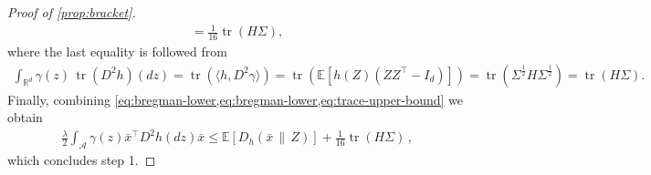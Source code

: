 \documentclass[11pt]{article}
\newcommand{\R}{\mathbb R}
\newcommand{\E}{\mathbb E}
\newcommand{\tr}{\operatorname{tr}}
\newcommand{\1}{\mathbf 1}
\begin{document}
\begin{proof}[Proof of \cref{prop:bracket}]
\begin{align}
        =
        \frac1{16}\tr(H\Sigma),
        \label{eq:trace-upper-bound}
    \end{align}
    where the last equality is followed from
    \begin{align}
        \int_{\R^d}\gamma(z)\,\tr(D^2h)(dz)
        =
        \tr(\langle h, D^2\gamma\rangle)
        =
        \tr\left(\E\left[h(Z)(ZZ^\top-I_d)\right]\right)
        =
        \tr(\Sigma^{\frac12}H\Sigma^{\frac12})
        =
        \tr(H\Sigma).
        \label{eq:standardized-trace-curvature}
    \end{align}
    Finally, combining \cref{eq:bregman-lower,eq:bregman-lower,eq:trace-upper-bound} we obtain
    \begin{align}
        \frac\lambda2
        \int_{\mathcal A}
        \gamma(z)\bar{x}^\top D^2h(dz)\bar{x}
        \leq
        \E[D_h(\bar{x}\,\|\,Z)]
        +
        \frac1{16}\tr(H\Sigma)\,,
        \label{eq:bracket-step1}
    \end{align}
    which concludes step 1.


\end{proof}
\end{document}
